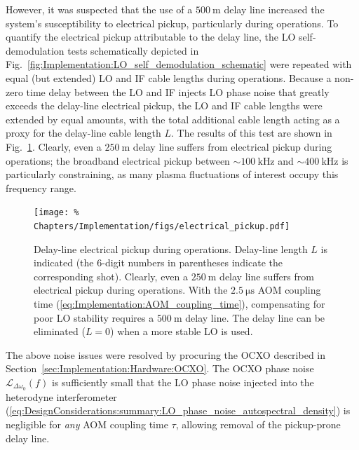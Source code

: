 However, it was suspected that the use of a $\SI{500}{\meter}$ delay line
increased the system's susceptibility to electrical pickup,
particularly during \diiid\space operations.
To quantify the electrical pickup attributable to the delay line,
the LO self-demodulation tests schematically depicted in
Fig.~\ref{fig:Implementation:LO_self_demodulation_schematic}
were repeated with equal (but extended) LO and IF cable lengths
during \diiid\space operations.
Because a non-zero time delay between the LO and IF
injects LO phase noise that greatly exceeds
the delay-line electrical pickup,
the LO and IF cable lengths were extended by equal amounts,
with the total additional cable length
acting as a proxy for the delay-line cable length $L$.
The results of this test are shown in
Fig.~\ref{fig:Implementation:electrical_pickup}.
Clearly, even a $\SI{250}{\meter}$ delay line
suffers from electrical pickup during \diiid\space operations;
the broadband electrical pickup between
$\sim \SI{100}{\kilo\hertz}$ and $\sim \SI{400}{\kilo\hertz}$
is particularly constraining,
as many plasma fluctuations of interest occupy this frequency range.

\begin{figure}
  \centering
  \texttt{[image: \%
    Chapters/Implementation/figs/electrical\_pickup.pdf]}
  \caption[Delay-line electrical pickup during \diiid\space operations]{%
    Delay-line electrical pickup during \diiid\space operations.
    Delay-line length $L$ is indicated
    (the $6$-digit numbers in parentheses indicate
    the corresponding \diiid\space shot).
    Clearly, even a $\SI{250}{\meter}$ delay line
    suffers from electrical pickup during \diiid\space operations.
    With the $\SI{2.5}{\micro\second}$ AOM coupling time
    (\ref{eq:Implementation:AOM_coupling_time}),
    compensating for poor LO stability
    requires a $\SI{500}{\meter}$ delay line.
    The delay line can be eliminated ($L = 0$)
    when a more stable LO is used.
  }
\label{fig:Implementation:electrical_pickup}
\end{figure}

The above noise issues were resolved by procuring the OCXO described in
Section~\ref{sec:Implementation:Hardware:OCXO}.
The OCXO phase noise $\mathcal{L}_{\Delta \omega_0}(f)$
is sufficiently small that
the LO phase noise injected into the heterodyne interferometer
(\ref{eq:DesignConsiderations:summary:LO_phase_noise_autospectral_density})
is negligible for \emph{any} AOM coupling time $\tau$,
allowing removal of the pickup-prone delay line.



